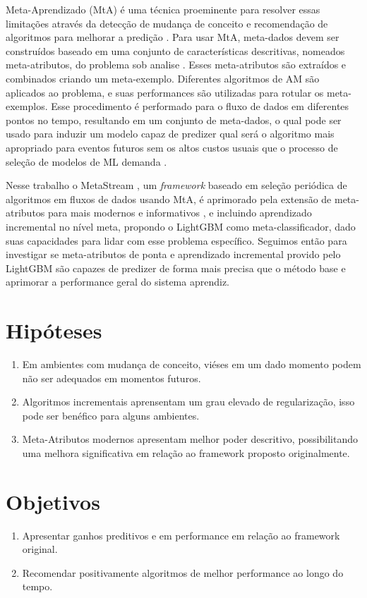 Meta-Aprendizado (MtA) é uma técnica proeminente para resolver essas limitações
através da detecção de mudança de conceito e recomendação de algoritmos para
melhorar a predição \cite{Anderson2019,VanRijn2016,Zarmehri2015}. Para usar
MtA, meta-dados devem ser construídos \cite{Vanschoren2018} baseado em uma
conjunto de características descritivas, nomeados meta-atributos, do problema
sob analise \cite{Rivolli2018}. Esses meta-atributos são extraídos e combinados
criando um meta-exemplo. Diferentes algoritmos de AM são aplicados ao problema,
e suas performances são utilizadas para rotular os meta-exemplos. Esse
procedimento é performado para o fluxo de dados em diferentes pontos no tempo,
resultando em um conjunto de meta-dados, o qual pode ser usado para induzir um
modelo capaz de predizer qual será o algoritmo mais apropriado para eventos
futuros sem os altos custos usuais que o processo de seleção de modelos de ML
demanda \cite{Munoz2018}.

Nesse trabalho o MetaStream \cite{rossi2012, rossi2014metastream}, um
\textit{framework} baseado em seleção periódica de algoritmos em fluxos de
dados usando MtA, é aprimorado pela extensão de meta-atributos para mais
modernos e informativos \cite{Rivolli2018}, e incluindo aprendizado incremental
no nível meta, propondo o  LightGBM \cite{ke2017lightgbm} como
meta-classificador, dado suas capacidades para lidar com esse problema
específico. Seguimos então para investigar se meta-atributos de ponta e
aprendizado incremental provido pelo LightGBM são capazes de predizer de forma
mais precisa que o método base e aprimorar a performance geral do sistema
aprendiz.


\section{Hipóteses}

\begin{enumerate}
    \item Em ambientes com mudança de conceito, viéses em um dado momento
        podem não ser adequados em momentos futuros.
    \item Algoritmos incrementais aprensentam um grau elevado de regularização,
        isso pode ser benéfico para alguns ambientes.
    \item Meta-Atributos modernos apresentam melhor poder descritivo,
        possibilitando uma melhora significativa em relação ao framework
        proposto originalmente.
\end{enumerate}

\section{Objetivos}

\begin{enumerate}
    \item Apresentar ganhos preditivos e em performance em relação ao framework
        original.
    \item Recomendar positivamente algoritmos de melhor performance ao longo do
        tempo.
\end{enumerate}
